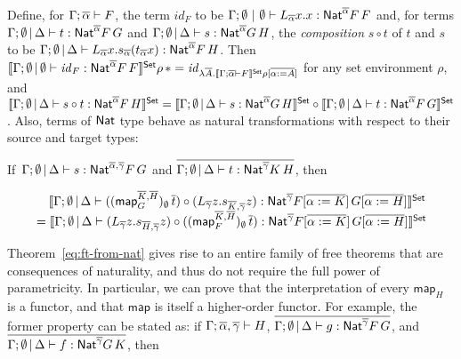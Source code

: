 \documentclass[runningheads]{llncs}
\renewcommand{\id}{\mathit{id}}
\newcommand{\map}{\mathsf{map}}
\renewcommand{\id}{\mathit{id}}
\begin{document}
Define, for $\Gamma; \overline{\alpha} \vdash F$, the term $\id_F$ to be
$\Gamma;\emptyset~|~\emptyset \vdash L_{\overline{\alpha}}x.x :
\mathsf{Nat}^{\overline{\alpha}} F\,F$ and, for terms $\Gamma; \emptyset \,|\,
\Delta \vdash t: \mathsf{Nat}^{\overline{\alpha}} F\,G$ and $\Gamma; \emptyset
\,|\, \Delta \vdash s: \mathsf{Nat}^{\overline{\alpha}} G\,H$, the {\em
  composition} $s \circ t$ of $t$ and $s$ to be $\Gamma;
\emptyset\,|\, \Delta \vdash L_{\overline{\alpha}}
x. s_{\overline{\alpha}}(t_{\overline{\alpha}}x):
\mathsf{Nat}^{\overline{\alpha}} F\,H$. Then $\setsem{\Gamma; \emptyset \,|\,
  \emptyset \vdash \id_{F} : \Nat^{\ol{\alpha}} F\,F} \rho\, \ast =
\id_{\lambda \ol{A}. \setsem{\Gamma; \ol{\alpha} \vdash F} \rho
  [\ol{\alpha := A}]}$ for any set environment $\rho$, and
$\llbracket{\Gamma; \emptyset \,|\, \Delta \vdash s \circ t:
  \mathsf{Nat}^{\overline{\alpha}} F\,H}\rrbracket^{\mathsf{Set}}\\ = \llbracket{\Gamma; \emptyset \,|\,
  \Delta \vdash s: \mathsf{Nat}^{\overline{\alpha}} G\,H}\rrbracket^{\mathsf{Set}} \circ 
\llbracket{\Gamma; \emptyset \,|\, \Delta \vdash t:
  \mathsf{Nat}^{\overline{\alpha}} F\,G}\rrbracket^{\mathsf{Set}}$. Also, terms of $\mathsf{Nat}$ type behave
as natural transformations with respect to their source and target
types:

\begin{theorem}\label{eq:ft-from-nat} 
  If\, $\Gamma; \emptyset \,|\, \Delta \vdash s : \mathsf{Nat}^{\overline{\alpha},
  \overline{\gamma}} F\,G$ and $\overline{\Gamma; \emptyset \,|\,
  \Delta \vdash t : \mathsf{Nat}^{\overline{\gamma}} K\, H}$, then

    \vspace*{-0.25in}
  
  \[\begin{array}{l}
  \hspace*{0.135in}
\setsem{\Gamma; \emptyset\,|\, \Delta
  \vdash 
  ((\map_G^{\overline{K}, \overline{H}})_\emptyset \,\overline{t}) \circ
(L_{\overline{\gamma}} z. s_{\overline{K}, \overline{\gamma}}
  z)
  : \Nat^{\overline{\gamma}} F[\overline{\alpha := K}]\,
  G[\overline{\alpha := H}]}\\
= \setsem{ \Gamma; \emptyset \,|\, \Delta \vdash
(L_{\overline{\gamma}} z.
  s_{\overline{H}, \overline{\gamma}} z)\circ
  ((\map_F^{\overline{K}, \overline{H}})_\emptyset \,
  \overline{t})  : \Nat^{\overline{\gamma}} F[\overline{\alpha :=
      K}]\, G[\overline{\alpha := H}]}
\end{array}\]
\end{theorem}

\noindent
Theorem~\ref{eq:ft-from-nat} gives rise to an entire family of free
theorems that are consequences of naturality, and thus do not require
the full power of parametricity. In particular, we can prove that the
interpretation of every $\map_H$ is a functor, and that $\map$ is
itself a higher-order functor. For example, the former property can be
stated as: if $\Gamma; \overline{\alpha}, \overline{\gamma} \vdash H$, $\overline{\Gamma;
  \emptyset \,|\, \Delta \vdash g : \mathsf{Nat}^{\overline{\gamma}} F \, G}$, and
$\overline{\Gamma; \emptyset \,|\, \Delta \vdash f : \mathsf{Nat}^{\overline{\gamma}} G \,
  K}$, then
\end{document}
